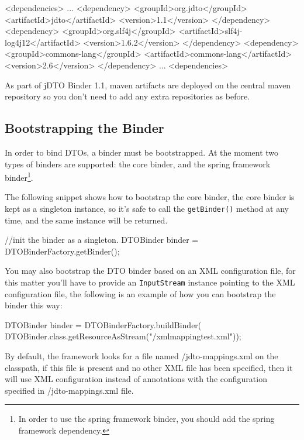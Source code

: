 \documentclass[11pt]{article}
\newcommand{\JDTO}{jDTO Binder\xspace}
\newcommand{\JDV}{1.1\xspace}
\newcommand{\DEFAULTCONFIG}{/jdto-mappings.xml\xspace}
\begin{document}
\begin{xml}
     <dependencies>
     ...
        <dependency>
            <groupId>org.jdto</groupId>
            <artifactId>jdto</artifactId>
            <version>1.1</version>
        </dependency>
        <dependency>
            <groupId>org.slf4j</groupId>
            <artifactId>slf4j-log4j12</artifactId>
            <version>1.6.2</version>
        </dependency>
        <dependency>
            <groupId>commons-lang</groupId>
            <artifactId>commons-lang</artifactId>
            <version>2.6</version>
        </dependency>
     ...
     <dependencies>
\end{xml}

As part of \JDTO \JDV, maven artifacts are deployed on the central maven repository so you don't need to add any extra repositories as before.

\subsection{Bootstrapping the Binder}


In order to bind DTOs, a binder must be bootstrapped. At the moment two types of binders
are supported: the core binder, and the spring framework binder\footnote{In order to use the spring framework binder, you should add the spring framework dependency.}.


The following snippet shows how to bootstrap the core binder, the core binder is kept as a singleton instance, so it's safe to call the \texttt{getBinder()} method at any time, and the same instance will be returned.


\begin{java}
//init the binder as a singleton.
DTOBinder binder = DTOBinderFactory.getBinder();
\end{java}

You may also bootstrap the DTO binder based on an XML configuration file, for this matter you'll have to provide an \texttt{InputStream} instance pointing to the XML configuration file, the following is an example of how you can bootstrap the binder this way:


\begin{java}
DTOBinder binder = DTOBinderFactory.buildBinder(
    DTOBinder.class.getResourceAsStream("/xmlmappingtest.xml"));
\end{java}

By default, the framework looks for a file named \DEFAULTCONFIG on the classpath, if this file is present and no other XML file has been specified, then it will use XML configuration instead of annotations with the configuration specified in \DEFAULTCONFIG file.
\end{document}
